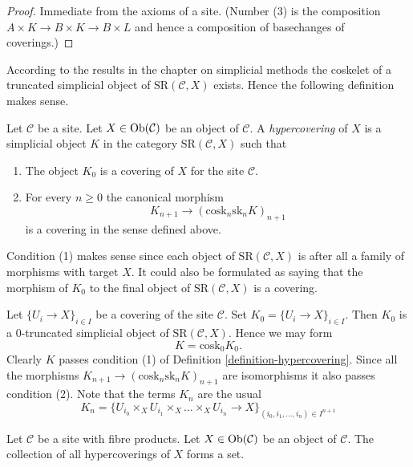 \begin{proof}
Immediate from the axioms of a site.
(Number (3) is the composition $A \times K \to B \times K \to B \times L$
and hence a composition of basechanges of coverings.)
\end{proof}

\noindent
According to the results in the chapter on simplicial methods the
coskelet of a truncated simplicial object of
$\text{SR}(\mathcal{C}, X)$ exists. Hence the following
definition makes sense.

\begin{definition}
\label{definition-hypercovering}
Let $\mathcal{C}$ be a site.
Let $X \in \mathop{\rm Ob}\nolimits(\mathcal{C})$ be an object of $\mathcal{C}$.
A {\it hypercovering} of $X$ is a simplicial object
$K$ in the category $\text{SR}(\mathcal{C}, X)$ such that
\begin{enumerate}
\item The object $K_0$ is a covering of $X$ for the site $\mathcal{C}$.
\item For every $n \geq 0$ the canonical morphism
$$
K_{n + 1} \longrightarrow (\text{cosk}_n \text{sk}_n K)_{n + 1}
$$
is a covering in the sense defined above.
\end{enumerate}
\end{definition}

\noindent
Condition (1) makes sense since each object of
$\text{SR}(\mathcal{C}, X)$ is after all a family
of morphisms with target $X$. It could also be
formulated as saying that the morphism of $K_0$ to
the final object of $\text{SR}(\mathcal{C}, X)$
is a covering.

\begin{example}
\label{example-cech}
Let $\{U_i \to X\}_{i \in I}$ be a covering of the site $\mathcal{C}$.
Set $K_0 = \{U_i \to X\}_{i \in I}$.
Then $K_0$ is a $0$-truncated simplicial object of
$\text{SR}(\mathcal{C}, X)$. Hence we may form
$$
K = \text{cosk}_0 K_0.
$$
Clearly $K$ passes condition (1) of Definition \ref{definition-hypercovering}.
Since all the morphisms $K_{n + 1} \to (\text{cosk}_n \text{sk}_n K)_{n + 1}$
are isomorphisms it also passes condition (2). Note that
the terms $K_n$ are the usual
$$
K_n = \{
U_{i_0} \times_X U_{i_1} \times_X \ldots \times_X U_{i_n} \to X
\}_{(i_0, i_1, \ldots, i_n) \in I^{n + 1}}
$$
\end{example}

\begin{lemma}
\label{lemma-hypercoverings-set}
Let $\mathcal{C}$ be a site with fibre products.
Let $X \in \mathop{\rm Ob}\nolimits(\mathcal{C})$ be an object of $\mathcal{C}$.
The collection of all hypercoverings of $X$ forms a set.
\end{lemma}

